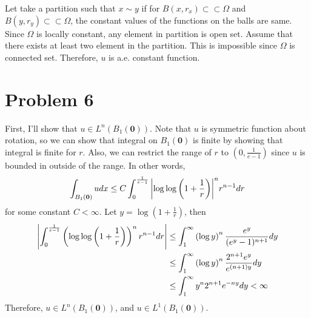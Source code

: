 \documentclass{article}
\begin{document}
Let take a partition such that $x\sim y$ if for $B(x,r_x)\subset\subset \Omega$ and $B(y, r_y)\subset\subset \Omega$, the constant values of the functions on the balls are same. Since $\Omega$ is locally constant, any element in partition is open set. Assume that there exists at least two element in the partition. This is impossible since $\Omega$ is connected set. Therefore, $u$ is a.e. constant function.
\section*{Problem 6}
First, I'll show that $u\in L^n(B_1(\bm{0}))$. Note that $u$ is symmetric function about rotation, so we can show that integral on $B_1(\bm{0})$ is finite by showing that integral is finite for $r$. Also, we can restrict the range of $r$ to $\left(0, \frac{1}{e-1}\right)$ since $u$ is bounded in outside of the range. In other words,
\begin{equation*}
\int_{B_1(\bm{0})}udx\leq C\int_0^{\frac{1}{e-1}} \abs{\log\log\left(1+\frac{1}{r}\right)}^{n}r^{n-1}dr
\end{equation*}
for some constant $C<\infty$. Let $y=\log\left(1+\frac{1}{r}\right)$, then
\begin{equation*}
\begin{split}
\abs{\int_0^{\frac{1}{e-1}} \left(\log\log\left(1+\frac{1}{r}\right)\right)^{n}r^{n-1}dr}&\leq\int_{1}^\infty \left(\log y\right)^n \frac{e^y}{(e^y-1)^{n+1}} dy \\
&\leq \int_{1}^\infty\left(\log y\right)^n \frac{2^{n+1}e^y}{e^{(n+1)y}}dy \\
&\leq \int_{1}^\infty y^n 2^{n+1}e^{-ny}dy<\infty
\end{split}
\end{equation*}
Therefore, $u\in L^n(B_1(\bm{0}))$, and $u\in L^1(B_1(\bm{0}))$.
\end{document}
